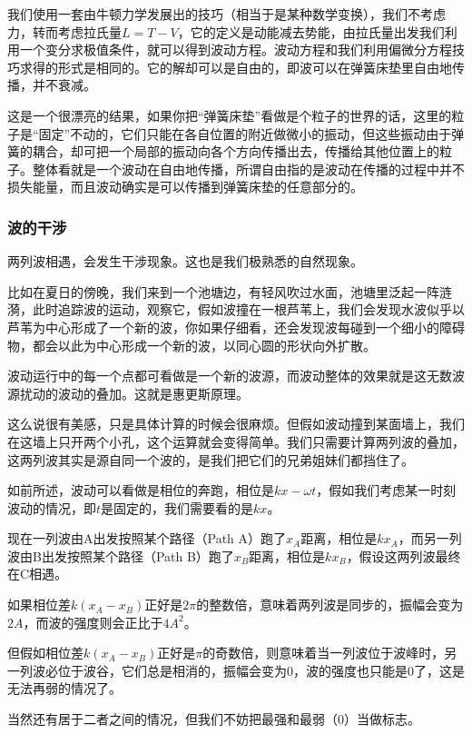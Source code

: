 我们使用一套由牛顿力学发展出的技巧（相当于是某种数学变换），我们不考虑力，转而考虑拉氏量$L = T - V$，它的定义是动能减去势能，由拉氏量出发我们利用一个变分求极值条件，就可以得到波动方程。波动方程和我们利用偏微分方程技巧求得的形式是相同的。它的解却可以是自由的，即波可以在弹簧床垫里自由地传播，并不衰减。

这是一个很漂亮的结果，如果你把“弹簧床垫”看做是个粒子的世界的话，这里的粒子是“固定”不动的，它们只能在各自位置的附近做微小的振动，但这些振动由于弹簧的耦合，却可把一个局部的振动向各个方向传播出去，传播给其他位置上的粒子。整体看就是一个波动在自由地传播，所谓自由指的是波动在传播的过程中并不损失能量，而且波动确实是可以传播到弹簧床垫的任意部分的。

\subsubsection{波的干涉}

两列波相遇，会发生干涉现象。这也是我们极熟悉的自然现象。

比如在夏日的傍晚，我们来到一个池塘边，有轻风吹过水面，池塘里泛起一阵涟漪，此时追踪波的运动，观察它，假如波撞在一根芦苇上，我们会发现水波似乎以芦苇为中心形成了一个新的波，你如果仔细看，还会发现波每碰到一个细小的障碍物，都会以此为中心形成一个新的波，以同心圆的形状向外扩散。

波动运行中的每一个点都可看做是一个新的波源，而波动整体的效果就是这无数波源扰动的波动的叠加。这就是惠更斯原理。

这么说很有美感，只是具体计算的时候会很麻烦。但假如波动撞到某面墙上，我们在这墙上只开两个小孔，这个运算就会变得简单。我们只需要计算两列波的叠加，这两列波其实是源自同一个波的，是我们把它们的兄弟姐妹们都挡住了。

如前所述，波动可以看做是相位的奔跑，相位是$k x - \omega t$，假如我们考虑某一时刻波动的情况，即$t$是固定的，我们需要看的是$k x$。

现在一列波由A出发按照某个路径（Path A）跑了$x_A$距离，相位是$k x_A$，而另一列波由B出发按照某个路径（Path B）跑了$x_B$距离，相位是$k x_B$，假设这两列波最终在C相遇。

如果相位差$k (x_A - x_B)$正好是$2 \pi$的整数倍，意味着两列波是同步的，振幅会变为$2A$，而波的强度则会正比于$4A^2$。

但假如相位差$k (x_A - x_B)$正好是$\pi$的奇数倍，则意味着当一列波位于波峰时，另一列波必位于波谷，它们总是相消的，振幅会变为$0$，波的强度也只能是0了，这是无法再弱的情况了。

当然还有居于二者之间的情况，但我们不妨把最强和最弱（0）当做标志。

